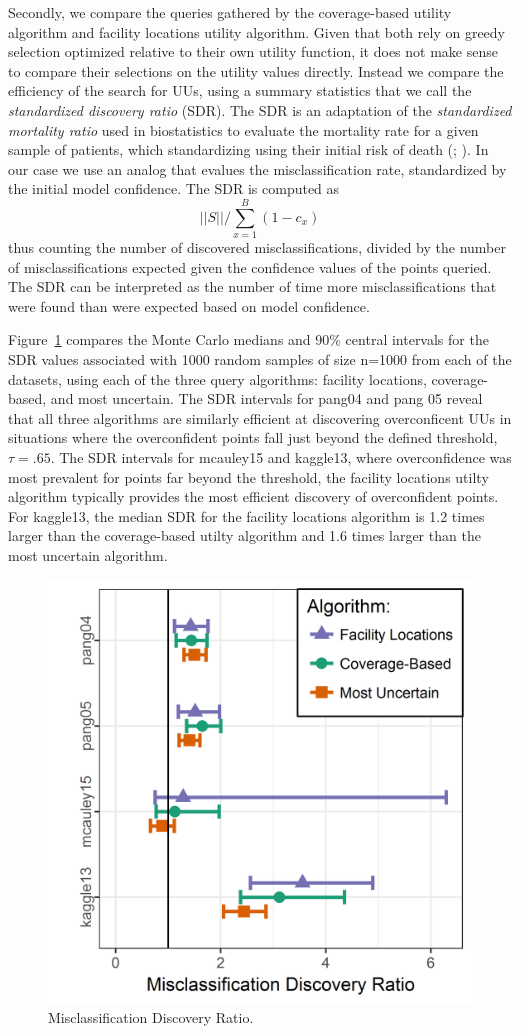 \documentclass[letterpaper]{article} %
\begin{document}
Secondly, we compare the queries gathered by the coverage-based utility algorithm and facility locations utility algorithm. Given that both rely on greedy selection optimized relative to their own utility function, it does not make sense to compare their selections on the utility values directly. Instead we compare the efficiency of the search for UUs, using a summary statistics that we call the \textit{standardized discovery ratio} (SDR). The SDR is an adaptation of the \textit{standardized mortality ratio} used in biostatistics to evaluate the mortality rate for a given sample of patients, which standardizing using their initial risk of death (\citealt{taylor2013standardized}; \citealt{rosner2015fundamentals}). In our case we use an analog that evalues the misclassification rate, standardized by the initial model confidence. The SDR is computed as
$$ ||S|| / \sum_{x=1}^B(1- c_x) $$
thus counting the number of discovered misclassifications, divided by the number of misclassifications expected given the confidence values of the points queried. The SDR can be interpreted as the number of time more misclassifications that were found than were expected based on model confidence. 

Figure~\ref{fig:sdr} compares the Monte Carlo medians and 90\%  central intervals for the SDR values associated with 1000 random samples of size n=1000 from each of the datasets, using each of the three query algorithms: facility locations, coverage-based, and most uncertain. The SDR intervals for pang04 and pang 05 reveal that all three algorithms are similarly efficient at discovering overconficent UUs in situations where the overconfident points fall just beyond the defined threshold, $\tau = .65$. The SDR intervals for mcauley15 and kaggle13, where overconfidence was most prevalent for points far beyond the threshold, the facility locations utilty algorithm typically provides the most efficient discovery of overconfident points. For kaggle13, the median SDR for the facility locations algorithm is 1.2 times larger than the coverage-based utilty algorithm and 1.6 times larger than the most uncertain algorithm.

\begin{figure}[hbtp]
  \includegraphics[width=.49\textwidth]{../experimentsAndPlots/discoveryRatioPlaceholder.png}
  \caption{Misclassification Discovery Ratio.}
  \label{fig:sdr}
\end{figure}
\end{document}
